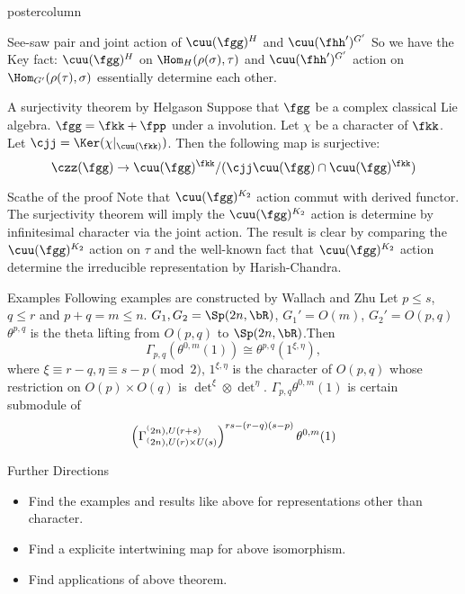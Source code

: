 \documentclass[final,hyperref={pdfpagelabels=false}]{beamer} %
\begin{document}
\begin{frame}
\begin{columns}
\begin{column}{.49\textwidth}
\begin{beamercolorbox}[center,wd=\textwidth]{postercolumn}
\begin{minipage}[T]{.95\textwidth}
{\begin{block}{See-saw pair and  joint action of $\cuu(\fgg)^H$ 
and $\cuu(\fhh')^{G'}$}
So we have the Key fact: $\cuu(\fgg)^H$ on $\Hom_H(\rho(\sigma),\tau)$ and $\cuu(\fhh')^{G'}$  action on $\Hom_{G'}(\rho(\tau),\sigma)$ essentially determine each other.
\end{block}

\begin{block}{A surjectivity theorem by Helgason}
  Suppose that $\fgg$ be a complex classical Lie algebra.  
  $\fgg = \fkk+\fpp$ under a involution. 
  Let $\chi$ be a character of $\fkk$.
  Let $\cjj = \Ker(\chi|_{\cuu(\fkk)})$.
  Then the following map is surjective:
  \[
  \czz(\fgg) \to \cuu(\fgg)^\fkk/(\cjj\cuu(\fgg)\cap\cuu(\fgg)^\fkk)
  \]
\end{block}

\begin{block}{Scathe of the proof}
  Note that $\cuu(\fgg)^{K_2}$ action commut with derived functor. 
  The surjectivity theorem will imply the $\cuu(\fgg)^{K_2}$ action is determine by
  infinitesimal character via the joint action.
  The result is clear by  comparing the $\cuu(\fgg)^{K_2}$ action on $\tau$
  and the well-known fact that $\cuu(\fgg)^{K_2}$ action determine the 
  irreducible representation by Harish-Chandra.
\end{block}

\begin{block}{Examples}
      Following examples are constructed by Wallach and Zhu
      Let $p\leq s$, $q\leq r$ and $p+q=m\leq n$.  
      $G_1,G_2 = \Sp(2n,\bR)$, $G_1' = O(m)$, $G_2'=O(p,q)$ 
      $\theta^{p,q}$ is the theta lifting from $O(p,q)$ to
      $\Sp(2n,\bR)$.Then 
      \[
      \displaystyle
      \Gamma_{p,q}(\theta^{0,m}(1)) \cong \theta^{p,q}(1^{\xi,\eta}),\]
      where $
      \xi \equiv r-q, \eta\equiv s-p \pmod{2}$,
      $1^{\xi,\eta}$ is the character of $O(p,q)$
      whose restriction on $O(p)\times O(q)$ is
      $\det^\xi\otimes \det^\eta$. 
      $\Gamma_{p,q}\theta^{0,m}(1)$ is certain submodule of
      \[
      \left(\Gamma_{\sp(2n),U(r)\times U(s)}^{\sp(2n),
          U(r+s)}\right)^{rs-(r-q)(s-p)}\theta^{0,m}(1)
      \]
    \end{block}
 
     \begin{block}{Further Directions}
       \begin{minipage}{\textwidth}
         \begin{itemize}
           \item Find the examples and results like above for representations other than character.
           \item Find a explicite intertwining map for above isomorphism.
           \item Find applications of above theorem.
         \end{itemize}
       \end{minipage}
     \end{block}

}
\end{minipage}
\end{beamercolorbox}
\end{column}
\end{columns}
\end{frame}
\end{document}
